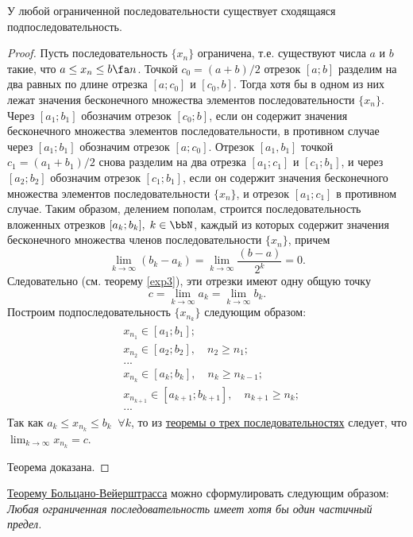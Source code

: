\begin{thm} \label{ch1.1thm3}
\label{exp9}
 У любой ограниченной последовательности существует сходящаяся подпоследовательность.
\end{thm}
\begin{proof}
Пусть последовательность $\{x_n\}$ ограничена, т.е. существуют числа $a$ и $b$ такие, что $a \le x_n \le b \fa n$. Точкой
$c_0 = (a + b)/2$ отрезок $[a; b]$ разделим на два равных по длине отрезка $[a; c_0]$ и $[c_0,b]$. Тогда хотя бы в одном из них лежат значения бесконечного множества элементов последовательности $\{x_n\}$. Через $[a_1;b_1]$ обозначим отрезок $[c_0;b]$, если он содержит значения бесконечного множества элементов последовательности, в противном случае через $[a_1; b_1]$ обозначим отрезок $[a; c_0]$. Отрезок $[a_1, b_1]$ точкой $c_1 = (a_1 + b_1)/2$ снова разделим на два отрезка $[a_1;c_1]$ и $[c_1;b_1]$, и через $[a_2;b_2]$ обозначим отрезок $[c_1;b_1]$, если он содержит значения бесконечного множества элементов последовательности $\{x_n\}$, и отрезок $[a_1; c_1]$ в противном случае. Таким образом, делением пополам, строится последовательность вложенных отрезков $[a_k;b_k],\; k \in \bbN$, каждый из которых содержит значения бесконечного множества членов последовательности $\{x_n\}$, причем
$$
\lim_{k\to \infty}(b_k-a_k)=\lim_{k \to \infty}\frac{(b-a)}{2^k}=0.
$$
Следовательно (см. теорему \ref{exp3}), эти отрезки имеют одну общую точку
$$
c = \lim_{k \to \infty} a_k = \lim_{k \to \infty} b_k.
$$
Построим подпоследовательность $\{x_{n_k}\}$ следующим образом:
\begin{gather*}
\begin{aligned}
& x_{n_1} \in [a_1;b_1];\\
& x_{n_2} \in [a_2;b_2],\quad n_2 \ge n_1;\\
& ...\\
& x_{n_k} \in [a_k;b_k],\quad n_k \ge n_{k-1};\\
& x_{n_{k+1}} \in [a_{k+1};b_{k+1}],\quad n_{k+1} \ge n_k;\\
& ...
\end{aligned}
\end{gather*}
Так как $a_k \le x_{n_k} \le b_k \;\; \forall k$, то из \hyperref[exp10]{теоремы о трех последовательностях} следует, что $\lim_{k \to \infty}\limits x_{n_k} = c$.

Теорема доказана.
\end{proof}

\hyperref[exp9]{Теорему Больцано-Вейерштрасса} можно сформулировать следующим образом: \textit{Любая ограниченная последовательность имеет хотя бы один частичный предел.}


